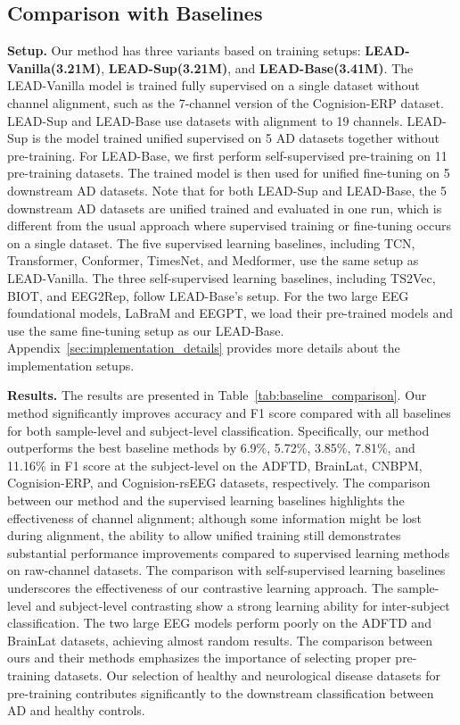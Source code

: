 


\subsection{Comparison with Baselines}
\label{sub:baseline_comparsion}

\textbf{Setup.} Our method has three variants based on training setups: \textbf{LEAD-Vanilla(3.21M)}, \textbf{LEAD-Sup(3.21M)}, and \textbf{LEAD-Base(3.41M)}. The LEAD-Vanilla model is trained fully supervised on a single dataset without channel alignment, such as the 7-channel version of the Cognision-ERP dataset. LEAD-Sup and LEAD-Base use datasets with alignment to 19 channels. LEAD-Sup is the model trained unified supervised on 5 AD datasets together without pre-training. For LEAD-Base, we first perform self-supervised pre-training on 11 pre-training datasets. The trained model is then used for unified fine-tuning on 5 downstream AD datasets. Note that for both LEAD-Sup and LEAD-Base, the 5 downstream AD datasets are unified trained and evaluated in one run, which is different from the usual approach where supervised training or fine-tuning occurs on a single dataset. The five supervised learning baselines, including TCN, Transformer, Conformer, TimesNet, and Medformer, use the same setup as LEAD-Vanilla. The three self-supervised learning baselines, including TS2Vec, BIOT, and EEG2Rep, follow LEAD-Base's setup. For the two large EEG foundational models, LaBraM and EEGPT, we load their pre-trained models and use the same fine-tuning setup as our LEAD-Base. Appendix~\ref{sec:implementation_details} provides more details about the implementation setups.


\textbf{Results.}
The results are presented in Table~\ref{tab:baseline_comparison}. Our method significantly improves accuracy and F1 score compared with all baselines for both sample-level and subject-level classification. Specifically, our method outperforms the best baseline methods by 6.9\%, 5.72\%, 3.85\%, 7.81\%, and 11.16\% in F1 score at the subject-level on the ADFTD, BrainLat, CNBPM, Cognision-ERP, and Cognision-rsEEG datasets, respectively. The comparison between our method and the supervised learning baselines highlights the effectiveness of channel alignment; although some information might be lost during alignment, the ability to allow unified training still demonstrates substantial performance improvements compared to supervised learning methods on raw-channel datasets. The comparison with self-supervised learning baselines underscores the effectiveness of our contrastive learning approach. The sample-level and subject-level contrasting show a strong learning ability for inter-subject classification. The two large EEG models perform poorly on the ADFTD and BrainLat datasets, achieving almost random results. The comparison between ours and their methods emphasizes the importance of selecting proper pre-training datasets. Our selection of healthy and neurological disease datasets for pre-training contributes significantly to the downstream classification between AD and healthy controls.

